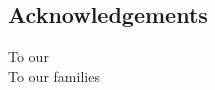 \pagestyle{plain}
\begin{center}


\section*{Acknowledgements}

To our \\
To our families \\
\end{center}



\cleardoublepage
